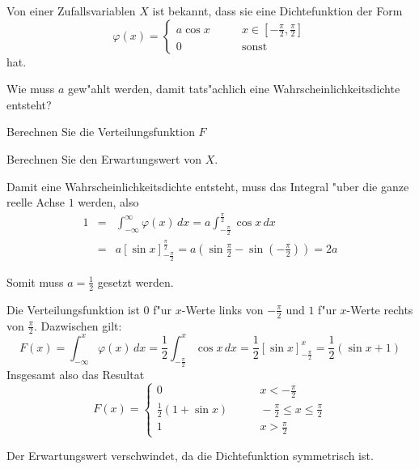 Von einer Zufallsvariablen $X$ ist bekannt, dass sie eine Dichtefunktion
der Form
\[
\varphi(x)=\begin{cases}
a\cos x&\qquad x\in[-\frac{\pi}2,\frac{\pi}2]\\
0&\qquad\text{sonst}
\end{cases}
\]
hat.
\begin{teilaufgaben}
\item Wie muss $a$ gew"ahlt werden, damit tats"achlich eine
Wahrscheinlichkeitsdichte entsteht?
\item Berechnen Sie die Verteilungsfunktion $F$
\item Berechnen Sie den Erwartungswert von $X$.
\end{teilaufgaben}

\begin{loesung}
\begin{teilaufgaben}
\item Damit eine Wahrscheinlichkeitsdichte entsteht, muss das Integral
"uber die ganze reelle Achse $1$ werden, also
\begin{eqnarray*}
1&=&\int_{-\infty}^\infty\varphi(x)\,dx
=a\int_{-\frac{\pi}2}^{\frac{\pi}2}\cos x\,dx\\
&=&a\left[\sin x\right]_{-\frac{\pi}2}^{\frac{\pi}2}
=a\left(\sin\frac{\pi}2 -\sin\left(-\frac{\pi}2\right)\right)
=2a
\end{eqnarray*}

Somit muss $a=\frac12$ gesetzt werden.
\item Die Verteilungsfunktion ist $0$ f"ur $x$-Werte links von $-\frac{\pi}2$
und $1$ f"ur $x$-Werte rechts von $\frac{\pi}2$. Dazwischen gilt:
\[
F(x)=\int_{-\infty}^x\varphi(x)\,dx
=\frac12\int_{-\frac{\pi}2}^x\cos x\,dx
=\frac12\left[\sin x\right]_{-\frac{\pi}2}^x
=\frac12(\sin x + 1)
\]
Insgesamt also das Resultat
\[
F(x)=\begin{cases}
0&\qquad x<-\frac{\pi}2\\
\frac12(1+\sin x)&\qquad -\frac{\pi}2\le x\le\frac{\pi}2\\
1&\qquad x>\frac{\pi}2
\end{cases}
\]
\item Der Erwartungswert verschwindet, da die Dichtefunktion symmetrisch ist.
\end{teilaufgaben}
\end{loesung}

